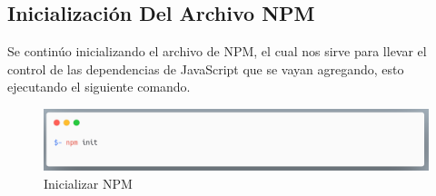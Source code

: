     \subsection{Inicialización Del Archivo NPM}
    Se continúo inicializando el archivo de NPM, el cual nos sirve para llevar el control de las dependencias de JavaScript que se vayan agregando, esto ejecutando el siguiente comando.
    \newline
    \newline
     \begin{figure}[H]
    \includegraphics[width=1\textwidth]{./Imagenes/image11.png}
     \caption[Inicializar NPM]{Inicializar NPM}
         \end{figure}
    
